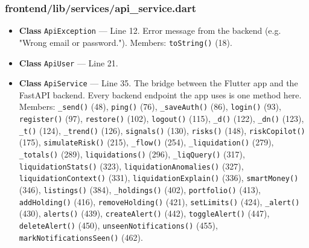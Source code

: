 \subsubsection*{frontend/lib/services/api\_service.dart}
\begin{itemize}[nosep,leftmargin=1.5em]
\item \textbf{Class} \texttt{ApiException} --- Line 12. Error message from the backend (e.g. "Wrong email or password."). Members: \texttt{toString(\allowbreak{})} (18).
\item \textbf{Class} \texttt{ApiUser} --- Line 21.
\item \textbf{Class} \texttt{ApiService} --- Line 35. The bridge between the Flutter app and the FastAPI backend. Every backend endpoint the app uses is one method here. Members: \texttt{\_\allowbreak{}send(\allowbreak{})} (48), \texttt{ping(\allowbreak{})} (76), \texttt{\_\allowbreak{}saveAuth(\allowbreak{})} (86), \texttt{login(\allowbreak{})} (93), \texttt{register(\allowbreak{})} (97), \texttt{restore(\allowbreak{})} (102), \texttt{logout(\allowbreak{})} (115), \texttt{\_\allowbreak{}d(\allowbreak{})} (122), \texttt{\_\allowbreak{}dn(\allowbreak{})} (123), \texttt{\_\allowbreak{}t(\allowbreak{})} (124), \texttt{\_\allowbreak{}trend(\allowbreak{})} (126), \texttt{signals(\allowbreak{})} (130), \texttt{risks(\allowbreak{})} (148), \texttt{riskCopilot(\allowbreak{})} (175), \texttt{simulateRisk(\allowbreak{})} (215), \texttt{\_\allowbreak{}flow(\allowbreak{})} (254), \texttt{\_\allowbreak{}liquidation(\allowbreak{})} (279), \texttt{\_\allowbreak{}totals(\allowbreak{})} (289), \texttt{liquidations(\allowbreak{})} (296), \texttt{\_\allowbreak{}liqQuery(\allowbreak{})} (317), \texttt{liquidationStats(\allowbreak{})} (323), \texttt{liquidationAnomalies(\allowbreak{})} (327), \texttt{liquidationContext(\allowbreak{})} (331), \texttt{liquidationExplain(\allowbreak{})} (336), \texttt{smartMoney(\allowbreak{})} (346), \texttt{listings(\allowbreak{})} (384), \texttt{\_\allowbreak{}holdings(\allowbreak{})} (402), \texttt{portfolio(\allowbreak{})} (413), \texttt{addHolding(\allowbreak{})} (416), \texttt{removeHolding(\allowbreak{})} (421), \texttt{setLimits(\allowbreak{})} (424), \texttt{\_\allowbreak{}alert(\allowbreak{})} (430), \texttt{alerts(\allowbreak{})} (439), \texttt{createAlert(\allowbreak{})} (442), \texttt{toggleAlert(\allowbreak{})} (447), \texttt{deleteAlert(\allowbreak{})} (450), \texttt{unseenNotifications(\allowbreak{})} (455), \texttt{markNotificationsSeen(\allowbreak{})} (462).
\end{itemize}
